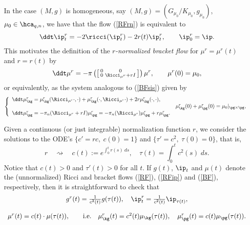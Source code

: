 \documentclass[11pt]{amsart}
\theoremstyle{plain}
\theoremstyle{definition}
\theoremstyle{remark}
\begin{document}
In the case $(M,g)$ is homogeneous, say $(M,g)=\left(G_{\mu_0}/K_{\mu_0},g_{\mu_0}\right)$, $\mu_0\in\hca_{q,n}$, we have that the flow (\ref{RFrn}) is equivalent to
\begin{equation}\label{RFiprn}
\ddt\ip^r_t=-2\ricci(\ip^r_t)-2r(t)\ip^r_t, \qquad \ip^r_0=\ip.
\end{equation}
This motivates the definition of the {\it $r$-normalized bracket flow} for $\mu^r=\mu^r(t)$ and $r=r(t)$ by
\begin{equation}\label{BFrn}
\ddt\mu^r=-\pi\left(\left[\begin{smallmatrix} 0&0\\ 0&\Ricci_{\mu^r}+rI
\end{smallmatrix}\right]\right)\mu^r, \qquad \mu^r(0)=\mu_0,
\end{equation}
or equivalently, as the system analogous to (\ref{BFsis}) given by
\begin{equation}\label{BFrnsis}
\left\{\begin{array}{ll}
\ddt\mu^r_{\kg}=\mu^r_{\kg}(\Ricci_{\mu^r}\cdot,\cdot)+\mu^r_{\kg}(\cdot,\Ricci_{\mu^r}\cdot) +2r\mu_{\kg}^r(\cdot,\cdot), & \\
& \mu^r_{\kg}(0)+\mu^r_{\pg}(0)=\mu_0|_{\pg\times\pg},\\
\ddt\mu^r_{\pg}=-\pi_n(\Ricci_{\mu^r}+rI)\mu^r_{\pg} =-\pi_n(\Ricci_{\mu^r})\mu^r_{\pg} +r\mu_{\pg}^r. &
\end{array}\right.
\end{equation}

Given a continuous (or just integrable) normalization function $r$, we consider the solutions to the ODE's $\{ c'=rc, \; c(0)=1\}$ and $\{ \tau'=c^2,\; \tau(0)=0\}$, that is,
\begin{equation}\label{defctau}
r\quad\rightsquigarrow \quad c(t):=e^{\int_0^t r(s)\; ds}, \quad \tau(t)=\int_0^t c^2(s)\; ds.
\end{equation}
Notice that $c(t)>0$ and $\tau'(t)>0$ for all $t$.  If $g(t)$, $\ip_t$ and $\mu(t)$ denote the (unnormalized) Ricci and bracket flows (\ref{RF}), (\ref{RFip}) and (\ref{BF}), respectively, then it is straightforward to check that
\begin{equation}\label{rnsol}
\begin{array}{c}
g^r(t)=\frac{1}{c^2(t)}g(\tau(t)), \quad \ip^r_t=\frac{1}{c^2(t)}\ip_{\tau(t)}, \\ \\ \mu^r(t)=c(t)\cdot\mu(\tau(t)), \qquad\mbox{i.e.}\quad \mu^r_{\kg}(t)=c^2(t)\mu_{\kg}(\tau(t)), \quad \mu^r_{\pg}(t)=c(t)\mu_{\pg}(\tau(t)).
\end{array}
\end{equation}
\end{document}
